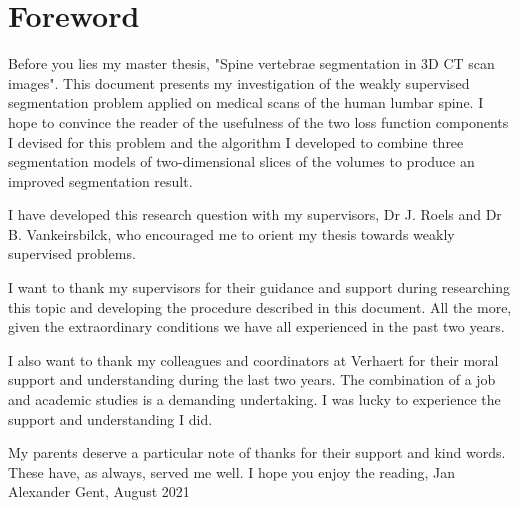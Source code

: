 \chapter*{Foreword}

\par{
Before you lies my master thesis, "Spine vertebrae segmentation in 3D CT scan images".
This document presents my investigation of the weakly supervised segmentation problem applied on medical scans of the human lumbar spine.
I hope to convince the reader of the usefulness of the two loss function components I devised for this problem and the algorithm I developed to combine three segmentation models of two-dimensional slices of the volumes to produce an improved segmentation result.
}
\par{
I have developed this research question with my supervisors, Dr J. Roels and Dr B. Vankeirsbilck, who encouraged me to orient my thesis towards weakly supervised problems.
}
\par{
I want to thank my supervisors for their guidance and support during researching this topic and developing the procedure described in this document.
All the more, given the extraordinary conditions we have all experienced in the past two years.
}
\par{
I also want to thank my colleagues and coordinators at Verhaert for their moral support and understanding during the last two years.
The combination of a job and academic studies is a demanding undertaking.
I was lucky to experience the support and understanding I did.
}
\par{
My parents deserve a particular note of thanks for their support and kind words. These have, as always, served me well.
}\newline
\vspace{1cm}
I hope you enjoy the reading,\newline
Jan Alexander\newline
\vspace{1cm}
Gent, August 2021
\clearpage\null\newpage